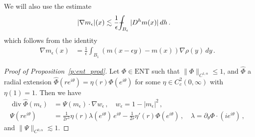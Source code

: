 \documentclass[fleqn
]{article}
\numberwithin{equation}{section}
\newcommand{\e}{\epsilon}
\DeclareMathOperator{\dv}{div}
\def\Xint#1{\mathchoice
	{\XXint\displaystyle\textstyle{#1}}%
	{\XXint\textstyle\scriptstyle{#1}}%
	{\XXint\scriptstyle\scriptscriptstyle{#1}}%
	{\XXint\scriptscriptstyle\scriptscriptstyle{#1}}%
	\!\int}
\def\XXint#1#2#3{{\setbox0=\hbox{$#1{#2#3}{\int}$}
		\vcenter{\hbox{$#2#3$}}\kern-.5\wd0}}
\theoremstyle{definition}
\begin{document}
We will also use the estimate
\begin{align}\label{eq:estim_grad_meps}
|\nabla m_\e|(x)
&
\lesssim \frac{1}{\e}\Xint{-}_{B_\e} |D^h m(x)|\, dh\,.
\end{align}
which follows from the identity
\begin{align*}
\nabla m_\e(x)
&
=\frac{1}{\e}\int_{B_1}(m(x-\e y)-m(x))\nabla\rho(y)\, dy\,.
\end{align*}






\begin{proof}[Proof of Proposition~\ref{p:ent_prod}]
Let $\Phi\in \mathrm{ENT}$ such that $\|\Phi\|_{C^{1,\alpha}}\leq 1$,
and $\widehat\Phi$ a radial extension $\widehat\Phi(re^{i\theta})=\eta(r)\Phi(e^{i\theta})$ for some $\eta\in C_c^2(0,\infty)$ with $\eta(1)=1$.
Then we have
\begin{align*}
\dv\widehat\Phi(m_\e)
&
=\Psi(m_\e)\cdot\nabla w_\e\,,
\quad w_\e =1-|m_\e|^2\,,
\\
\Psi(re^{i\theta})
&
=
\frac{1}{2r^2}\eta(r)\lambda(e^{i\theta})\, e^{i\theta}
-\frac 1{2r}\eta'(r)\Phi(e^{i\theta})
\,,
\quad \lambda=\partial_\theta\Phi\cdot (ie^{i\theta})\,,
\end{align*}
and
$\|\Psi\|_{C^{0,\alpha}}\lesssim 1$. 

\medskip


\end{proof}
\end{document}

